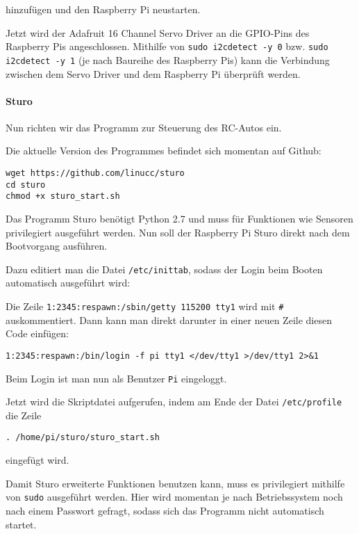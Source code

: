 \documentclass[a4paper,10pt]{scrartcl}
\begin{document}
    hinzufügen und den Raspberry Pi neustarten.

    Jetzt wird der Adafruit 16 Channel Servo Driver an die GPIO-Pins des
    Raspberry Pis angeschlossen.
    Mithilfe von \lstinline{sudo i2cdetect -y 0} bzw.
    \lstinline{sudo i2cdetect -y 1} (je nach Baureihe des Raspberry Pis) kann
    die Verbindung zwischen dem Servo Driver und dem Raspberry Pi überprüft
    werden.\cite{adafruitlearn}

  \paragraph{Sturo} Nun richten wir das Programm zur Steuerung des RC-Autos ein.

    Die aktuelle Version des Programmes befindet sich momentan auf Github:

    \begin{lstlisting}
wget https://github.com/linucc/sturo
cd sturo
chmod +x sturo_start.sh
    \end{lstlisting}

    Das Programm Sturo benötigt Python 2.7 und muss für Funktionen wie Sensoren
    privilegiert ausgeführt werden.
    Nun soll der Raspberry Pi Sturo direkt nach dem Bootvorgang ausführen.

    Dazu editiert man die Datei \lstinline{/etc/inittab}, sodass der Login beim
    Booten automatisch ausgeführt wird:

    Die Zeile \lstinline{1:2345:respawn:/sbin/getty 115200 tty1} wird mit
    \lstinline{#} auskommentiert.
    Dann kann man direkt darunter in einer neuen Zeile diesen Code einfügen:
    \begin{lstlisting}
1:2345:respawn:/bin/login -f pi tty1 </dev/tty1 >/dev/tty1 2>&1
    \end{lstlisting}
    Beim Login ist man nun als Benutzer \lstinline{Pi} eingeloggt.
    \cite{opentech}

    Jetzt wird die Skriptdatei aufgerufen, indem am Ende der Datei
    \lstinline{/etc/profile} die Zeile
    \begin{lstlisting}
. /home/pi/sturo/sturo_start.sh
    \end{lstlisting}
    eingefügt wird.

    Damit Sturo erweiterte Funktionen benutzen kann, muss es privilegiert
    mithilfe von \lstinline{sudo} ausgeführt werden.
    Hier wird momentan je nach Betriebssystem noch nach einem Passwort gefragt,
    sodass sich das Programm nicht automatisch startet.
\end{document}
